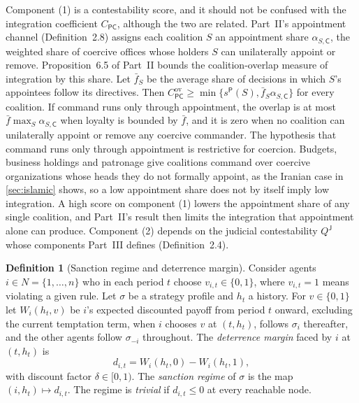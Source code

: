\documentclass[11pt,letterpaper]{article}
\theoremstyle{definition}
\newtheorem{definition}[theorem]{Definition}
\theoremstyle{remark}
\newcommand{\pP}{\mathsf{P}}
\newcommand{\pJ}{\mathsf{J}}
\newcommand{\pC}{\mathsf{C}}
\begin{document}
Component (1) is a contestability score, and it should not be confused with the integration coefficient $C_{\pP\pC}$, although the two are related. Part~II's appointment channel (Definition~2.8) assigns each coalition $S$ an appointment share $\alpha_{S,\pC}$, the weighted share of coercive offices whose holders $S$ can unilaterally appoint or remove. Proposition~6.5 of Part~II bounds the coalition-overlap measure of integration by this share. Let $\bar f_S$ be the average share of decisions in which $S$'s appointees follow its directives. Then $C^{\mathrm{ov}}_{\pP\pC} \ge \min\{s^{\pP}(S), \bar f_S\alpha_{S,\pC}\}$ for every coalition. If command runs only through appointment, the overlap is at most $\bar f \max_S \alpha_{S,\pC}$ when loyalty is bounded by $\bar f$, and it is zero when no coalition can unilaterally appoint or remove any coercive commander. The hypothesis that command runs only through appointment is restrictive for coercion. Budgets, business holdings and patronage give coalitions command over coercive organizations whose heads they do not formally appoint, as the Iranian case in \cref{sec:islamic} shows, so a low appointment share does not by itself imply low integration. A high score on component (1) lowers the appointment share of any single coalition, and Part~II's result then limits the integration that appointment alone can produce. Component (2) depends on the judicial contestability $Q^{\pJ}$ whose components Part~III defines (Definition~2.4).

\begin{definition}[Sanction regime and deterrence margin]
\label{def:coercive-power:regime}
Consider agents $i \in N = \{1,\dots,n\}$ who in each period $t$ choose $v_{i,t} \in \{0,1\}$, where $v_{i,t} = 1$ means violating a given rule. Let $\sigma$ be a strategy profile and $h_t$ a history. For $v \in \{0,1\}$ let $W_i(h_t, v)$ be $i$'s expected discounted payoff from period $t$ onward, excluding the current temptation term, when $i$ chooses $v$ at $(t,h_t)$, follows $\sigma_i$ thereafter, and the other agents follow $\sigma_{-i}$ throughout. The \emph{deterrence margin} faced by $i$ at $(t,h_t)$ is
\begin{equation}
d_{i,t} = W_i(h_t, 0) - W_i(h_t, 1),
\label{eq:margin}
\end{equation}
with discount factor $\delta \in [0,1)$. The \emph{sanction regime} of $\sigma$ is the map $(i, h_t) \mapsto d_{i,t}$. The regime is \emph{trivial} if $d_{i,t} \le 0$ at every reachable node.
\end{definition}
\end{document}
